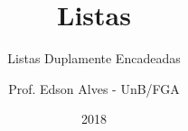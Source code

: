 \title{Listas}
\subtitle{Listas Duplamente Encadeadas}
\author{Prof. Edson Alves - UnB/FGA}
\date{2018}
